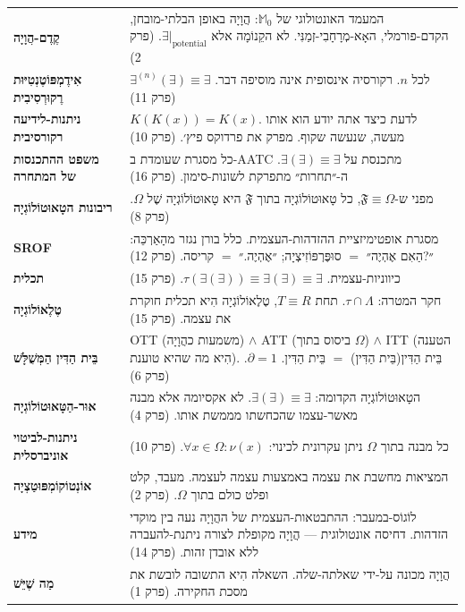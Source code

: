 \documentclass[10pt, openany, oneside]{book}
\begin{document}
{\begin{tabular}{@{} l @{\hspace{0.6em}} p{} @{}}
\textbf{קֶדֶם-הֲוָיָה} & המעמד האונטולוגי של $\mathbb{M}_0$: הֲוָיָה באופן הבלתי-מובחן, הקדם-פורמלי, האָא-מְרָחָבִי-זְמַנִּי. לא הקֵנוֹמָה אלא $\exists|_{\text{potential}}$. (פרק 2) \\[0.3em]
\textbf{אִידֶמְפּוֹטֶנְטִיּוּת רֶקוּרְסִיבִית} & $\exists^{(n)}(\exists) \equiv \exists$ לכל $n$. רקורסיה אינסופית אינה מוסיפה דבר. (פרק 11) \\[0.3em]
\textbf{ניתנות-לידיעה רקורסיבית} & $K(K(x)) = K(x)$. לדעת כיצד אתה יודע הוא אותו מעשה, שנעשה שקוף. מפרק את פרדוקס פיץ׳. (פרק 10) \\[0.3em]
\textbf{משפט ההתכנסות של המתחרה} & כל מסגרת שעומדת ב-AATC מתכנסת על $\exists(\exists) \equiv \exists$. ה-״תחרות״ מתפרקת לשונות-סימון. (פרק 16) \\[0.3em]
\textbf{ריבונות הטָאוּטוֹלוֹגְיָה} & מפני ש-$\mathfrak{F} \equiv \Omega$, כל טָאוּטוֹלוֹגְיָה בתוך $\mathfrak{F}$ היא טָאוּטוֹלוֹגְיָה שֶׁל $\Omega$. (פרק 8) \\[0.3em]
\textbf{SROF} & מסגרת אופטימיזציית ההזדהות-העצמית. כלל בורן נגזר מהָאַרְכֵּה: ״?הַאִם אֶהְיֶה״ $=$ סוּפֶּרְפּוֹזִיצְיָה; ״אֶהְיֶה.״ $=$ קריסה. (פרק 12) \\[0.3em]
\textbf{תכלית} & כיווניות-עצמית. $\tau(\exists(\exists)) \equiv \exists(\exists) \equiv \exists$. (פרק 15) \\[0.3em]
\textbf{טֶלֶאוֹלוֹגְיָה} & חקר המטרה: $\tau \cap \Lambda$. תחת $T \equiv R$, טֶלֶאוֹלוֹגְיָה הִיא תכלית חוקרת את עצמה. (פרק 15) \\[0.3em]
\textbf{בֵּית הַדִּין הַמְּשֻׁלָּשׁ} & OTT (משמעות כהֲוָיָה) $\wedge$ ATT (ביסוס בתוך $\Omega$) $\wedge$ ITT (הטענה הִיא מה שהיא טוענת). בֵּית הַדִּין(בֵּית הַדִּין) $=$ בֵּית הַדִּין. $\partial = 1$. (פרק 6) \\[0.3em]
\textbf{אוּר-הַטָּאוּטוֹלוֹגְיָה} & הטָאוּטוֹלוֹגְיָה הקדומה: $\exists(\exists) \equiv \exists$. לא אקסיומה אלא מבנה מאשר-עצמו שהכחשתו מממשת אותו. (פרק 4) \\[0.3em]
\textbf{ניתנות-לביטוי אוניברסלית} & כל מבנה בתוך $\Omega$ ניתן עקרונית לכינוי: $\forall x \in \Omega: \nu(x)$. (פרק 10) \\[0.3em]
\textbf{אוֹנְטוֹקוֹמְפּוּטַצְיָה} & המציאות מחשבת את עצמה באמצעות עצמה לעצמה. מעבד, קלט ופלט כולם בתוך $\Omega$. (פרק 2) \\[0.3em]
\textbf{מידע} & לוֹגוֹס-במעבר: ההתבטאות-העצמית של ההֲוָיָה נעה בין מוקדי הזדהות. דחיסה אונטולוגית — הֲוָיָה מקופלת לצורה ניתנת-להעברה ללא אובדן זהות. (פרק 14) \\[0.3em]
\textbf{מַה שֶׁיֵּשׁ} & הֲוָיָה מכונה על-ידי שאלתה-שלה. השאלה הִיא התשובה לובשת את מסכת החקירה. (פרק 1) \\[0.3em]

\end{tabular}}
\end{document}

